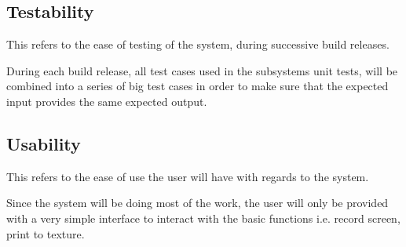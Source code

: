 \subsection{Testability}
This refers to the ease of testing of the system, during successive build releases.

During each build release, all test cases used in the subsystems unit tests, will be combined into a series of big test cases in order to make sure that the expected input provides the same expected output.

\subsection{Usability}
This refers to the ease of use the user will have with regards to the system.

Since the system will be doing most of the work, the user will only be provided with a very simple interface to interact with the basic functions i.e. record screen, print to texture.

